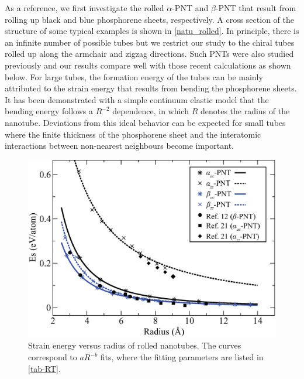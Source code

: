 As a reference, we first investigate the rolled $\alpha$-PNT and $\beta$-PNT that result from rolling up black and blue phosphorene sheets, respectively. A cross section of the structure of some typical examples is shown in \autoref{natu_rolled}. In principle, there is an infinite number of possible tubes but we restrict our study to the chiral tubes rolled up along the armchair and zigzag directions. Such PNTs were also studied previously\cite{Guan2014a,Guo2014} and our results compare well with those recent calculations as shown below. For large tubes, the formation energy of the tubes can be mainly attributed to the strain energy that results from bending the phosphorene sheets. It has been demonstrated with a simple continuum elastic model that the bending energy follows a $R^{-2}$ dependence, in which $R$ denotes the radius of the nanotube\cite{tib84,rob92}. Deviations from this ideal behavior can be expected for small tubes where the finite thickness of the phosphorene sheet and the interatomic interactions between non-nearest neighbours become important.

\begin{figure}[htbp]
\centering
\includegraphics[width=0.8\linewidth]{Nanotu_energy_tubes.eps}%
\caption{Strain energy versus radius of rolled nanotubes. The curves correspond to $aR^{-b}$ fits, where the fitting parameters are listed in \autoref{tab-RT}. \label{rolled_energy}}
\end{figure}

